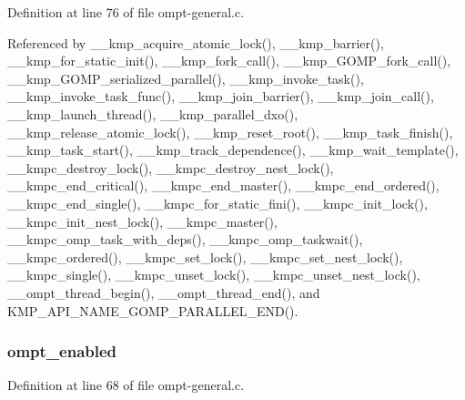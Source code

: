 Definition at line 76 of file ompt-\/general.\-c.



Referenced by \-\_\-\-\_\-kmp\-\_\-acquire\-\_\-atomic\-\_\-lock(), \-\_\-\-\_\-kmp\-\_\-barrier(), \-\_\-\-\_\-kmp\-\_\-for\-\_\-static\-\_\-init(), \-\_\-\-\_\-kmp\-\_\-fork\-\_\-call(), \-\_\-\-\_\-kmp\-\_\-\-G\-O\-M\-P\-\_\-fork\-\_\-call(), \-\_\-\-\_\-kmp\-\_\-\-G\-O\-M\-P\-\_\-serialized\-\_\-parallel(), \-\_\-\-\_\-kmp\-\_\-invoke\-\_\-task(), \-\_\-\-\_\-kmp\-\_\-invoke\-\_\-task\-\_\-func(), \-\_\-\-\_\-kmp\-\_\-join\-\_\-barrier(), \-\_\-\-\_\-kmp\-\_\-join\-\_\-call(), \-\_\-\-\_\-kmp\-\_\-launch\-\_\-thread(), \-\_\-\-\_\-kmp\-\_\-parallel\-\_\-dxo(), \-\_\-\-\_\-kmp\-\_\-release\-\_\-atomic\-\_\-lock(), \-\_\-\-\_\-kmp\-\_\-reset\-\_\-root(), \-\_\-\-\_\-kmp\-\_\-task\-\_\-finish(), \-\_\-\-\_\-kmp\-\_\-task\-\_\-start(), \-\_\-\-\_\-kmp\-\_\-track\-\_\-dependence(), \-\_\-\-\_\-kmp\-\_\-wait\-\_\-template(), \-\_\-\-\_\-kmpc\-\_\-destroy\-\_\-lock(), \-\_\-\-\_\-kmpc\-\_\-destroy\-\_\-nest\-\_\-lock(), \-\_\-\-\_\-kmpc\-\_\-end\-\_\-critical(), \-\_\-\-\_\-kmpc\-\_\-end\-\_\-master(), \-\_\-\-\_\-kmpc\-\_\-end\-\_\-ordered(), \-\_\-\-\_\-kmpc\-\_\-end\-\_\-single(), \-\_\-\-\_\-kmpc\-\_\-for\-\_\-static\-\_\-fini(), \-\_\-\-\_\-kmpc\-\_\-init\-\_\-lock(), \-\_\-\-\_\-kmpc\-\_\-init\-\_\-nest\-\_\-lock(), \-\_\-\-\_\-kmpc\-\_\-master(), \-\_\-\-\_\-kmpc\-\_\-omp\-\_\-task\-\_\-with\-\_\-deps(), \-\_\-\-\_\-kmpc\-\_\-omp\-\_\-taskwait(), \-\_\-\-\_\-kmpc\-\_\-ordered(), \-\_\-\-\_\-kmpc\-\_\-set\-\_\-lock(), \-\_\-\-\_\-kmpc\-\_\-set\-\_\-nest\-\_\-lock(), \-\_\-\-\_\-kmpc\-\_\-single(), \-\_\-\-\_\-kmpc\-\_\-unset\-\_\-lock(), \-\_\-\-\_\-kmpc\-\_\-unset\-\_\-nest\-\_\-lock(), \-\_\-\-\_\-ompt\-\_\-thread\-\_\-begin(), \-\_\-\-\_\-ompt\-\_\-thread\-\_\-end(), and K\-M\-P\-\_\-\-A\-P\-I\-\_\-\-N\-A\-M\-E\-\_\-\-G\-O\-M\-P\-\_\-\-P\-A\-R\-A\-L\-L\-E\-L\-\_\-\-E\-N\-D().

\hypertarget{ompt-internal_8h_a966b31b6d05f79f5495f8d8e71732f68}{
\subsubsection[{ompt\-\_\-enabled}]{ ompt\-\_\-enabled}}\label{ompt-internal_8h_a966b31b6d05f79f5495f8d8e71732f68}


Definition at line 68 of file ompt-\/general.\-c.



